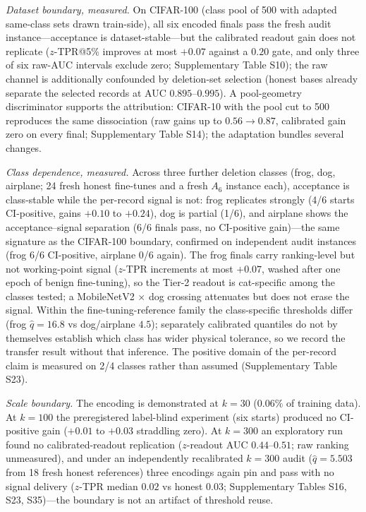 \documentclass[lettersize,journal]{IEEEtran}
\begin{document}
\emph{Dataset boundary, measured.} On CIFAR-100 (class pool
of 500 with adapted same-class sets drawn train-side), all
six encoded finals pass the fresh audit
instance---acceptance is dataset-stable---but the calibrated
readout gain does not replicate ($z$-TPR@5\% improves at most
$+0.07$ against a $0.20$ gate, and only three of six raw-AUC
intervals exclude zero; Supplementary Table S10); the raw
channel is additionally confounded by deletion-set selection
(honest bases already separate the selected records at AUC
$0.895$--$0.995$). A pool-geometry discriminator supports the
attribution: CIFAR-10 with the pool cut to 500 reproduces the
same dissociation (raw gains up to $0.56\to0.87$, calibrated
gain zero on every final; Supplementary Table S14); the
adaptation bundles several changes.

\emph{Class dependence, measured.} Across three further
deletion classes (frog, dog, airplane; 24 fresh honest
fine-tunes and a fresh $A_6$ instance each), acceptance is
class-stable while the per-record signal is not: frog
replicates strongly (4/6 starts CI-positive, gains $+0.10$
to $+0.24$), dog is partial (1/6), and airplane shows the
acceptance--signal separation (6/6 finals pass, no
CI-positive gain)---the same signature as the CIFAR-100
boundary, confirmed on independent audit instances (frog
6/6 CI-positive, airplane 0/6 again). The frog finals carry
ranking-level but not working-point signal ($z$-TPR
increments at most $+0.07$, washed after one epoch of benign
fine-tuning), so the Tier-2 readout is cat-specific among
the classes tested; a MobileNetV2 $\times$ dog crossing
attenuates but does not erase the signal. Within the
fine-tuning-reference family the class-specific thresholds
differ (frog $\hat q{=}16.8$ vs dog/airplane $4.5$);
separately calibrated quantiles do not by themselves
establish which class has wider physical tolerance, so we
record the transfer result without that inference. The
positive domain of the per-record claim is measured on 2/4
classes rather than assumed (Supplementary Table S23).

\emph{Scale boundary.} The encoding is demonstrated at
$k{=}30$ ($0.06\%$ of training data). At $k{=}100$ the
preregistered label-blind experiment (six starts) produced
no CI-positive gain ($+0.01$ to $+0.03$ straddling zero). At
$k{=}300$ an exploratory run found no calibrated-readout
replication ($z$-readout AUC $0.44$--$0.51$; raw ranking
unmeasured), and under an independently recalibrated
$k{=}300$ audit ($\hat q{=}5.503$ from 18 fresh honest
references) three encodings again pin and pass with no
signal delivery ($z$-TPR median $0.02$ vs honest $0.03$;
Supplementary Tables S16, S23, S35)---the boundary is not an
artifact of threshold reuse.
\end{document}
